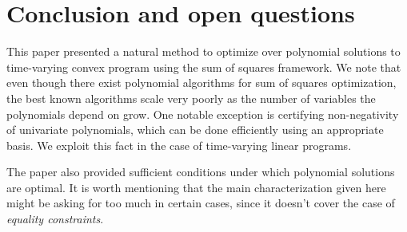 \documentclass[moor]{informs1}
\begin{document}
\section{Conclusion and open questions}
\label{sec:orgheadline24}

This paper presented a natural method to optimize over polynomial solutions to time-varying convex program using the sum of squares framework. We note that even though there exist polynomial algorithms for sum of squares optimization, the best known algorithms scale very poorly as the number of variables the polynomials depend on grow. One notable exception is certifying non-negativity of univariate polynomials, which can be done efficiently using an appropriate basis. We exploit this fact in the case of time-varying linear programs.

The paper also provided sufficient conditions under which polynomial solutions are optimal. It is worth mentioning that the main characterization given here might be asking for too much in certain cases, since it doesn't cover the case of \emph{equality constraints}.




\end{document}
